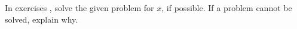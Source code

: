 {\noindent In exercises}
{, solve the given problem for $x$, if possible. If a problem cannot be solved, explain why.}
